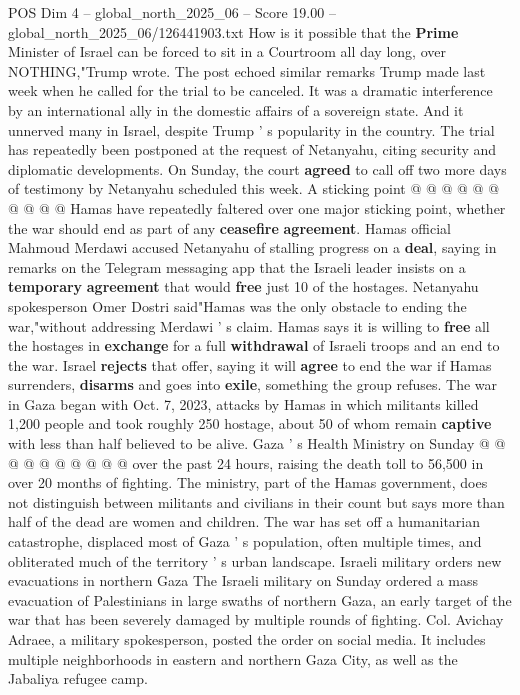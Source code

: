 \begin{textsample}{POS Dim 4 – global\_north\_2025\_06 – Score 19.00 – global\_north\_2025\_06/126441903.txt}
How is it possible that the \textbf{Prime} Minister of Israel can be forced to sit in a Courtroom all day long, over NOTHING,"Trump wrote.
The post echoed similar remarks Trump made last week when he called for the trial to be canceled.
It was a dramatic interference by an international ally in the domestic affairs of a sovereign state.
And it unnerved many in Israel, despite Trump ' s popularity in the country.
The trial has repeatedly been postponed at the request of Netanyahu, citing security and diplomatic developments.
On Sunday, the court \textbf{agreed} to call off two more days of testimony by Netanyahu scheduled this week.
A sticking point @ @ @ @ @ @ @ @ @ @ Hamas have repeatedly faltered over one major sticking point, whether the war should end as part of any \textbf{ceasefire} \textbf{agreement}.
Hamas official Mahmoud Merdawi accused Netanyahu of stalling progress on a \textbf{deal}, saying in remarks on the Telegram messaging app that the Israeli leader insists on a \textbf{temporary} \textbf{agreement} that would \textbf{free} just 10 of the hostages.
Netanyahu spokesperson Omer Dostri said"Hamas was the only obstacle to ending the war,"without addressing Merdawi ' s claim.
Hamas says it is willing to \textbf{free} all the hostages in \textbf{exchange} for a full \textbf{withdrawal} of Israeli troops and an end to the war.
Israel \textbf{rejects} that offer, saying it will \textbf{agree} to end the war if Hamas surrenders, \textbf{disarms} and goes into \textbf{exile}, something the group refuses.
The war in Gaza began with Oct. 7, 2023, attacks by Hamas in which militants killed 1,200 people and took roughly 250 hostage, about 50 of whom remain \textbf{captive} with less than half believed to be alive.
Gaza ' s Health Ministry on Sunday @ @ @ @ @ @ @ @ @ @ over the past 24 hours, raising the death toll to 56,500 in over 20 months of fighting.
The ministry, part of the Hamas government, does not distinguish between militants and civilians in their count but says more than half of the dead are women and children.
The war has set off a humanitarian catastrophe, displaced most of Gaza ' s population, often multiple times, and obliterated much of the territory ' s urban landscape.
Israeli military orders new evacuations in northern Gaza The Israeli military on Sunday ordered a mass evacuation of Palestinians in large swaths of northern Gaza, an early target of the war that has been severely damaged by multiple rounds of fighting.
Col.
Avichay Adraee, a military spokesperson, posted the order on social media.
It includes multiple neighborhoods in eastern and northern Gaza City, as well as the Jabaliya refugee camp.

\end{textsample}
